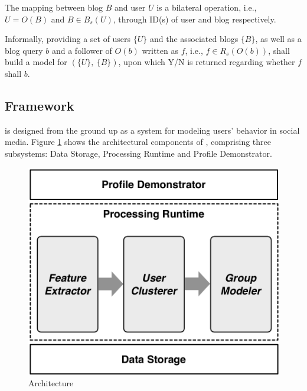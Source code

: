 The mapping between blog $B$ and user $U$ is a bilateral operation, i.e., $U = O(B)$ and $B \in B_s(U)$, through ID(s) of user and blog respectively.

Informally, providing a set of users $\{U\}$ and the associated blogs $\{B\}$, as well as a blog query $b$ and a follower of $O(b)$ written as $f$, i.e., $f \in R_s(O(b))$, \sys{} shall build a \retg{} model for $(\{U\},\ \{B\})$, upon which Y/N is returned regarding whether $f$ shall \ret{} $b$.


\subsection{\sys{} Framework}
\sys{} is designed from the ground up as a system for modeling users' \retg{} behavior in social media.
Figure \ref{fig:framework} shows the architectural components of \sys{}, comprising three subsystems: Data Storage, Processing Runtime and Profile Demonstrator.

\begin{figure}[!htb]
\centering
\includegraphics[width=.75\linewidth]{figures/architecture}
\caption{\sys{} Architecture}
\label{fig:framework}
\end{figure}


